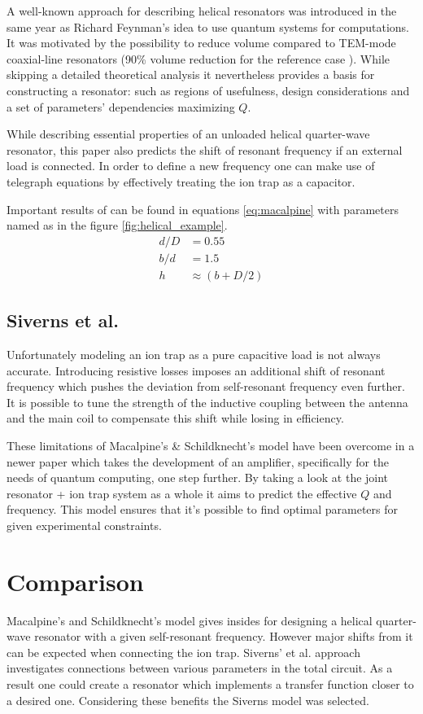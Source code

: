 A well-known approach \cite{Macalpine2000} for describing helical resonators was introduced in the same year as Richard Feynman's idea \cite{Feynman1960} to use quantum systems for computations. It was motivated by the possibility to reduce volume compared to TEM-mode coaxial-line resonators (90\% volume reduction for the reference case \cite{Macalpine2000}). While skipping a detailed theoretical analysis it nevertheless provides a basis for constructing a resonator: such as regions of usefulness, design considerations and a set of parameters' dependencies maximizing $Q$.

While describing essential properties of an unloaded helical quarter-wave resonator, this paper \cite{Macalpine2000} also predicts the shift of resonant frequency if an external load is connected. In order to define a new frequency one can make use of telegraph equations \cite{Rohde2009} by effectively treating the ion trap as a capacitor.

Important results of \cite{Macalpine2000} can be found in equations \ref{eq:macalpine} with parameters named as in the figure \ref{fig:helical_example}.
\begin{equation}
\begin{aligned}
	d/D &= 0.55\\
	b/d &= 1.5\\
	h &\approx (b + D/2)
\end{aligned}
\label{eq:macalpine}
\end{equation}
\subsection{Siverns et al.}
Unfortunately modeling an ion trap as a pure capacitive load is not always accurate. Introducing resistive losses imposes an additional shift of resonant frequency which pushes the deviation from self-resonant frequency even further. It is possible to tune the strength of the inductive coupling between the antenna and the main coil to compensate this shift while losing in efficiency.

These limitations of Macalpine's \& Schildknecht's \cite{Macalpine2000} model have been overcome in a newer paper \cite{Siverns2012} which takes the development of an amplifier, specifically for the needs of quantum computing, one step further. By taking a look at the joint resonator + ion trap system as a whole it aims to predict the effective $Q$ and frequency. This model ensures that it's possible to find optimal parameters for given experimental constraints.

\section{Comparison}
Macalpine's and Schildknecht's \cite{Macalpine2000} model gives insides for designing a helical quarter-wave resonator with a given self-resonant frequency. However major shifts from it can be expected when connecting the ion trap. Siverns' et al. approach \cite{Siverns2012} investigates connections between various parameters in the total circuit. As a result one could create a resonator which implements a transfer function closer to a desired one. Considering these benefits the Siverns model \cite{Siverns2012} was selected.